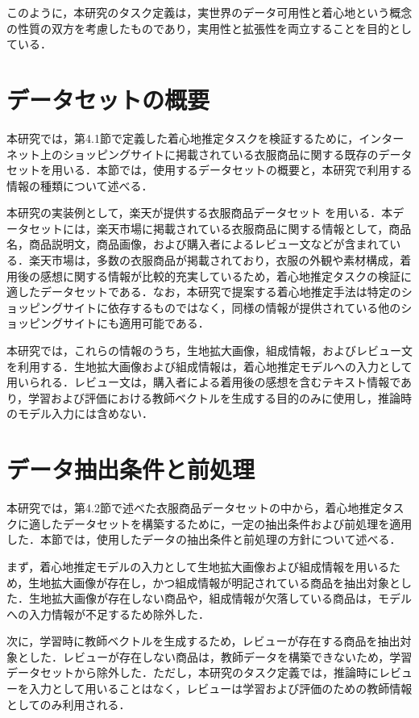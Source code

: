 \documentclass[a4paper,12pt]{jreport}
\begin{document}
このように，本研究のタスク定義は，実世界のデータ可用性と着心地という概念の性質の双方を考慮したものであり，実用性と拡張性を両立することを目的としている．


\section{データセットの概要}

本研究では，第4.1節で定義した着心地推定タスクを検証するために，インターネット上のショッピングサイトに掲載されている衣服商品に関する既存のデータセットを用いる．本節では，使用するデータセットの概要と，本研究で利用する情報の種類について述べる．

本研究の実装例として，楽天が提供する衣服商品データセット \cite{Rakuten} を用いる．本データセットには，楽天市場に掲載されている衣服商品に関する情報として，商品名，商品説明文，商品画像，および購入者によるレビュー文などが含まれている．楽天市場は，多数の衣服商品が掲載されており，衣服の外観や素材構成，着用後の感想に関する情報が比較的充実しているため，着心地推定タスクの検証に適したデータセットである．なお，本研究で提案する着心地推定手法は特定のショッピングサイトに依存するものではなく，同様の情報が提供されている他のショッピングサイトにも適用可能である．

本研究では，これらの情報のうち，生地拡大画像，組成情報，およびレビュー文を利用する．生地拡大画像および組成情報は，着心地推定モデルへの入力として用いられる．レビュー文は，購入者による着用後の感想を含むテキスト情報であり，学習および評価における教師ベクトルを生成する目的のみに使用し，推論時のモデル入力には含めない．


\section{データ抽出条件と前処理}
本研究では，第4.2節で述べた衣服商品データセットの中から，着心地推定タスクに適したデータセットを構築するために，一定の抽出条件および前処理を適用した．本節では，使用したデータの抽出条件と前処理の方針について述べる．

まず，着心地推定モデルの入力として生地拡大画像および組成情報を用いるため，生地拡大画像が存在し，かつ組成情報が明記されている商品を抽出対象とした．生地拡大画像が存在しない商品や，組成情報が欠落している商品は，モデルへの入力情報が不足するため除外した．

次に，学習時に教師ベクトルを生成するため，レビューが存在する商品を抽出対象とした．レビューが存在しない商品は，教師データを構築できないため，学習データセットから除外した．ただし，本研究のタスク定義では，推論時にレビューを入力として用いることはなく，レビューは学習および評価のための教師情報としてのみ利用される．
\end{document}
